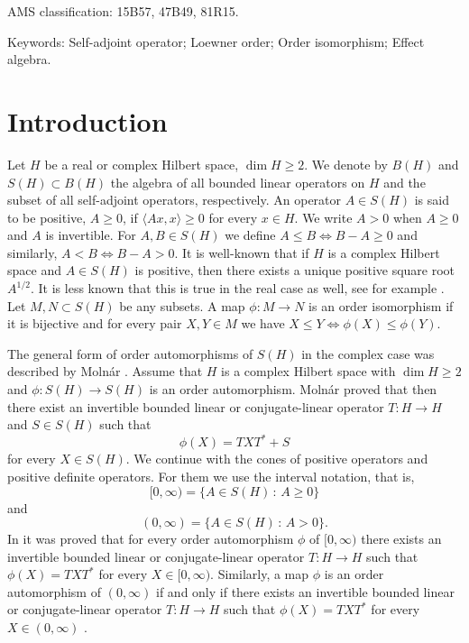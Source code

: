 \documentclass{article}
\begin{document}
\bigskip
\noindent AMS classification:  15B57, 47B49, 81R15.

\bigskip
\noindent
Keywords: Self-adjoint operator; Loewner order; Order isomorphism; Effect algebra.




\section{Introduction}

Let $H$ be a real or complex Hilbert space, $\dim H \ge 2$. We denote by $B(H)$ and $S(H)\subset B(H)$ the algebra of all bounded linear operators on $H$ and the subset of all self-adjoint operators, respectively. An operator $A \in S(H)$ is said to be positive, $A \ge 0$, if $\langle Ax , x \rangle \ge 0$ for every $x \in H$. We write $A > 0$ when $A \ge 0$ and $A$ is invertible. For $A, B \in S(H)$ we define $A \le B \iff B-A \ge 0$ and similarly, $A < B \iff B-A> 0$. It is well-known that if $H$ is a complex Hilbert space and $A \in S(H)$ is positive, then there exists a unique positive square root $A^{1/2}$. It is less known that this is true in the real case as well, see for example \cite{SeT}.
 Let $M,N \subset S(H)$ be any subsets. A map $\phi : M \to N$ is an order isomorphism if it is bijective and for every pair $X,Y \in M$ we have $X \le Y \iff \phi (X) \le \phi (Y)$.

The general form of order automorphisms of $S(H)$ in the complex case was described by Moln\' ar \cite{Mo1}.  Assume that $H$ is a complex Hilbert space with $\dim H \ge 2$
and  $\phi : S(H) \to S(H)$ is an order automorphism. Moln\' ar proved that then there exist an invertible bounded linear or conjugate-linear operator
$T : H \to H$ and $S \in S(H)$ such that
$$
\phi (X) = TXT^\ast + S
$$
for every $X\in S(H)$. We continue with the cones of positive operators
and positive definite operators. For them we use the interval notation, that is,  $$[0, \infty ) = \{ A \in S(H) \, : \, 
A \ge 0 \}$$ and  $$(0, \infty ) = \{ A \in S(H) \, : \, 
A >  0 \}.$$ In \cite{Mo1} it was proved that for every order automorphism $\phi$ of $[0, \infty)$ 
 there exists an invertible bounded linear or conjugate-linear operator
$T : H \to H$ such that
$
\phi (X) = TXT^\ast
$
for every $X\in [0, \infty)$. Similarly, a map
$\phi$ is an order automorphism of $(0, \infty)$ if and only if  there exists an invertible bounded linear or conjugate-linear operator
$T : H \to H$ such that
$
\phi (X) = TXT^\ast
$
for every $X\in (0, \infty)$ \cite{Mol}.
\end{document}
